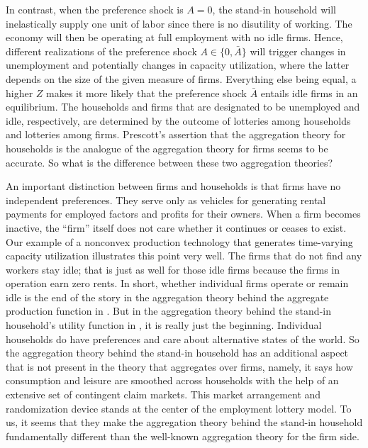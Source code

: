 In contrast, when the preference shock is $A=0$, the stand-in
household will inelastically supply one unit of labor since there
is no disutility of working. The economy will then be operating
at full employment with no idle firms. Hence, different realizations
of the preference
shock $A\in\{0,\bar A\}$ will trigger changes in unemployment
and potentially changes in capacity utilization, where the
latter depends on the size of the given measure of firms.
Everything else being equal, a higher $Z$  makes it  more likely that
the preference shock $\bar A$ entails idle firms in an equilibrium.
The households and firms
that are designated to be unemployed and idle, respectively,
are determined by the outcome of lotteries among households and
lotteries among firms. Prescott's assertion that the
aggregation theory for households is the analogue of the
aggregation theory for firms seems to be accurate. So what
is the difference between these two aggregation theories?

An important distinction between firms and households is that
firms have no independent
preferences.  They  serve only as vehicles for
generating rental payments for employed factors and profits for their owners.
When a firm becomes  inactive, the ``firm'' itself does not
care whether it continues or ceases  to exist. \newpage \noindent Our
example of a nonconvex production technology that generates
time-varying capacity utilization
illustrates this point very well. The firms that do not find any workers
stay idle;  that is just as well for those idle firms because
the firms in operation earn zero rents. In short, whether individual
firms operate or remain idle is the end of the
story in the aggregation theory behind the aggregate production
function in . But in the aggregation theory behind the stand-in
household's utility function in , it is really just the beginning.
Individual households do have preferences and
care about alternative states of the world. So the aggregation theory behind
the stand-in household has an additional aspect that is not present
in the theory that aggregates over firms, namely,
it says how consumption
and leisure are smoothed  across households with the help of an
extensive set of contingent claim markets.
This market arrangement and randomization device  stands at the
center of the employment lottery model.  To us, it seems that
they make the aggregation
theory behind the stand-in household fundamentally different than
the well-known aggregation theory for the firm side.





